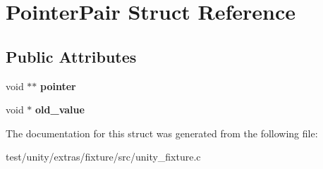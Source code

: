 \hypertarget{structPointerPair}{}\section{Pointer\+Pair Struct Reference}
\label{structPointerPair}
\subsection*{Public Attributes}
\begin{DoxyCompactItemize}
\item 
\mbox{\label{structPointerPair_a2875d2c1a18176e22513cf845e83d85c}} 
void $\ast$$\ast$ {\bfseries pointer}
\item 
\mbox{\label{structPointerPair_afa4927f6318fe77182704346b634da13}} 
void $\ast$ {\bfseries old\+\_\+value}
\end{DoxyCompactItemize}


The documentation for this struct was generated from the following file\+:\begin{DoxyCompactItemize}
\item 
test/unity/extras/fixture/src/unity\+\_\+fixture.\+c\end{DoxyCompactItemize}
